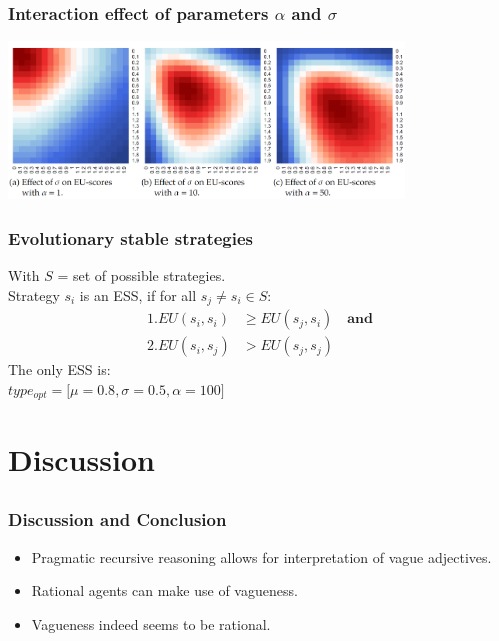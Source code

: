 \documentclass[8pt]{beamer}
\newcommand{\stp}{\item[$\bullet$]}%
\begin{document}
\begin{frame}
\frametitle{Interaction effect of parameters $\alpha$ and $\sigma$}
\vskip5mm
\includegraphics[width=10.5cm]{bilder/EU-interaction-effect.png}
\end{frame}

\begin{frame}
\frametitle{Evolutionary stable strategies}
With $S$ = set of possible strategies.\\

Strategy $s_i$ is an ESS, if for all $s_j \neq s_i \in  S$:
\begin{align*}
1. EU(s_i, s_i) &\geq EU(s_j, s_i) \quad \textbf{and} \\
2. EU(s_i, s_j) &> EU(s_j, s_j)
\end{align*}
\vskip5mm
The only ESS is:\\
\vskip5mm
$type_{opt} = \big[ \mu=0.8, \sigma=0.5, \alpha=100 \big] $
\end{frame}


\section{Discussion}
\subsection*{}
\begin{frame}
\frametitle{Discussion and Conclusion}
\vskip5mm
	\begin{itemize}
		\stp Pragmatic recursive reasoning allows for interpretation of vague adjectives.\newline
		\stp Rational agents can make use of vagueness.  \newline
		\stp Vagueness indeed seems to be rational.\newline
	\end{itemize}
\end{frame}
\end{document}
